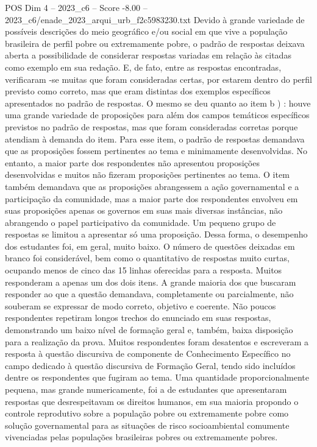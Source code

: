 \begin{textsample}{POS Dim 4 – 2023\_c6 – Score -8.00 – 2023\_c6/enade\_2023\_arqui\_urb\_f2c5983230.txt}
Devido à grande variedade de possíveis descrições do meio geográfico e/ou social em que vive a população brasileira de perfil pobre ou extremamente pobre, o padrão de respostas deixava aberta a possibilidade de considerar respostas variadas em relação às citadas como exemplo em sua redação.
E, de fato, entre as respostas encontradas, verificaram -se muitas que foram consideradas certas, por estarem dentro do perfil previsto como correto, mas que eram distintas dos exemplos específicos apresentados no padrão de respostas.
O mesmo se deu quanto ao item b ) : houve uma grande variedade de proposições para além dos campos temáticos específicos previstos no padrão de respostas, mas que foram consideradas corretas porque atendiam à demanda do item.
Para esse item, o padrão de respostas demandava que as proposições fossem pertinentes ao tema e minimamente desenvolvidas.
No entanto, a maior parte dos respondentes não apresentou proposições desenvolvidas e muitos não fizeram proposições pertinentes ao tema.
O item também demandava que as proposições abrangessem a ação governamental e a participação da comunidade, mas a maior parte dos respondentes envolveu em suas proposições apenas os governos em suas mais diversas instâncias, não abrangendo o papel participativo da comunidade.
Um pequeno grupo de respostas se limitou a apresentar só uma proposição.
Dessa forma, o desempenho dos estudantes foi, em geral, muito baixo.
O número de questões deixadas em branco foi considerável, bem como o quantitativo de respostas muito curtas, ocupando menos de cinco das 15 linhas oferecidas para a resposta.
Muitos responderam a apenas um dos dois itens.
A grande maioria dos que buscaram responder ao que a questão demandava, completamente ou parcialmente, não souberam se expressar de modo correto, objetivo e coerente.
Não poucos respondentes repetiram longos trechos do enunciado em suas respostas, demonstrando um baixo nível de formação geral e, também, baixa disposição para a realização da prova.
Muitos respondentes foram desatentos e escreveram a resposta à questão discursiva de componente de Conhecimento Específico no campo dedicado à questão discursiva de Formação Geral, tendo sido incluídos dentre os respondentes que fugiram ao tema.
Uma quantidade proporcionalmente pequena, mas grande numericamente, foi a de estudantes que apresentaram respostas que desrespeitavam os direitos humanos, em sua maioria propondo o controle reprodutivo sobre a população pobre ou extremamente pobre como solução governamental para as situações de risco socioambiental comumente vivenciadas pelas populações brasileiras pobres ou extremamente pobres.

\end{textsample}
